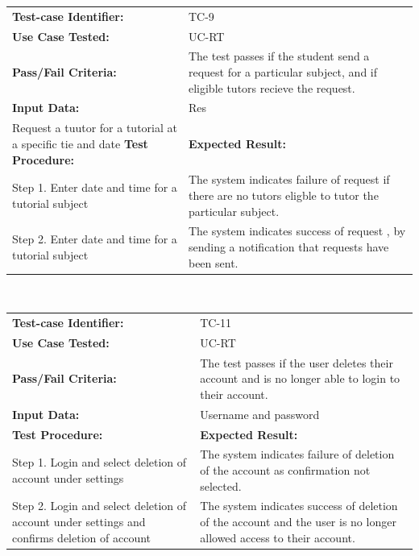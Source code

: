 \documentclass[12pt]{article}
\begin{document}
{\begin{tabular}{| p{8cm} | p{8cm} |} \hline
	\textbf{Test-case Identifier:}& TC-9\\
	\textbf{Use Case Tested:}& UC-RT\\
	\textbf{Pass/Fail Criteria:}& The test passes if the student send a request for a particular subject, and if eligible  tutors recieve the request.\\
	\textbf{Input Data:}& Res\\\hline Request a tuutor for a tutorial at a specific tie and date
	\textbf{Test Procedure:}& \textbf{Expected Result:} \\\hline
	Step 1. Enter date and time for a tutorial subject & The system indicates failure of request if there are no tutors eligble to tutor the particular subject. \\
	Step 2. Enter date and time for a tutorial subject & The system indicates success of request , by sending a notification that requests have been sent.\\
		\hline
\end{tabular}
\\

\begin{tabular}{| p{8cm} | p{8cm} |} \hline
	\textbf{Test-case Identifier:}& TC-11\\
	\textbf{Use Case Tested:}& UC-RT\\
	\textbf{Pass/Fail Criteria:}& The test passes if the user deletes their account and is no longer able to login to their account.\\
	\textbf{Input Data:}& Username and password\\\hline
	\textbf{Test Procedure:}& \textbf{Expected Result:} \\\hline
	Step 1. Login and select deletion of account under settings & The system indicates failure of deletion of the account as confirmation not selected. \\
	Step 2. Login and select deletion of account under settings and confirms deletion of account& The system indicates success of deletion of the account and the user is no longer allowed access to their account.\\
		\hline
\end{tabular}
\\

}
\end{document}
